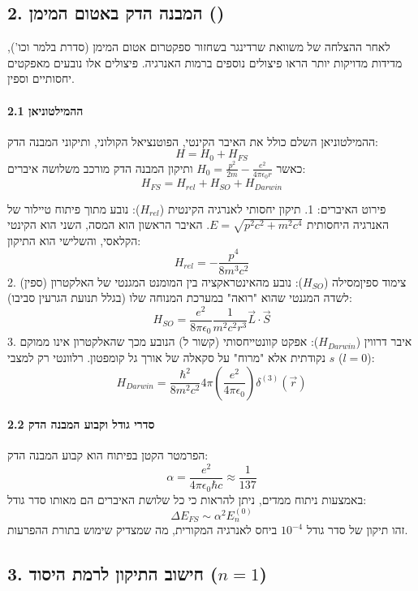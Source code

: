 \subsection*{2. המבנה הדק באטום המימן ()}

לאחר ההצלחה של משוואת שרדינגר בשחזור ספקטרום אטום המימן (סדרת בלמר וכו'), מדידות מדויקות יותר הראו פיצולים נוספים ברמות האנרגיה. פיצולים אלו נובעים מאפקטים יחסותיים וספין.

\paragraph{2.1 ההמילטוניאן}
ההמילטוניאן השלם כולל את האיבר הקינטי, הפוטנציאל הקולוני, ותיקוני המבנה הדק:
\[ H = H_0 + H_{FS} \]
כאשר $H_0 = \frac{p^2}{2m} - \frac{e^2}{4\pi\epsilon_0 r}$ ותיקון המבנה הדק מורכב משלושה איברים:
\[ H_{FS} = H_{rel} + H_{SO} + H_{Darwin} \]

פירוט האיברים:
1.  תיקון יחסותי לאנרגיה הקינטית ($H_{rel}$):
    נובע מתוך פיתוח טיילור של האנרגיה היחסותית $E = \sqrt{p^2c^2 + m^2c^4}$. האיבר הראשון הוא המסה, השני הוא הקינטי הקלאסי, והשלישי הוא התיקון:
    \[ H_{rel} = -\frac{p^4}{8m^3c^2} \]
2.  צימוד ספיןמסילה ($H_{SO}$):
    נובע מהאינטראקציה בין המומנט המגנטי של האלקטרון (ספין) לשדה המגנטי שהוא "רואה" במערכת המנוחה שלו (בגלל תנועת הגרעין סביבו):
    \[ H_{SO} = \frac{e^2}{8\pi\epsilon_0} \frac{1}{m^2c^2 r^3} \vec{L} \cdot \vec{S} \]
3.  איבר דרווין ($H_{Darwin}$):
    אפקט קוונטייחסותי (קשור ל) הנובע מכך שהאלקטרון אינו ממוקם נקודתית אלא "מרוח" על סקאלה של אורך גל קומפטון. רלוונטי רק למצבי $s$ ($l=0$):
    \[ H_{Darwin} = \frac{\hbar^2}{8m^2c^2} 4\pi \left(\frac{e^2}{4\pi\epsilon_0}\right) \delta^{(3)}(\vec{r}) \]

\paragraph{2.2 סדרי גודל וקבוע המבנה הדק}
הפרמטר הקטן בפיתוח הוא קבוע המבנה הדק:
\[ \alpha = \frac{e^2}{4\pi\epsilon_0 \hbar c} \approx \frac{1}{137} \]
באמצעות ניתוח ממדים, ניתן להראות כי כל שלושת האיברים הם מאותו סדר גודל:
\[ \Delta E_{FS} \sim \alpha^2 E_n^{(0)} \]
זהו תיקון של סדר גודל $10^{-4}$ ביחס לאנרגיה המקורית, מה שמצדיק שימוש בתורת ההפרעות.



\subsection*{3. חישוב התיקון לרמת היסוד ($n=1$)}

